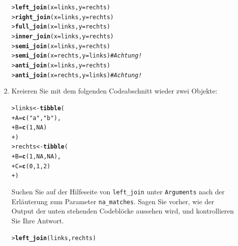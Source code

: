 \documentclass[oneside, 10pt]{book}\usepackage[]{graphicx}\usepackage[]{xcolor}
\makeatletter
\newcommand{\hlnum}[1]{\textcolor[rgb]{0.686,0.059,0.569}{#1}}%
\newcommand{\hlstr}[1]{\textcolor[rgb]{0.192,0.494,0.8}{#1}}%
\newcommand{\hlcom}[1]{\textcolor[rgb]{0.678,0.584,0.686}{\textit{#1}}}%
\newcommand{\hlstd}[1]{\textcolor[rgb]{0.345,0.345,0.345}{#1}}%
\newcommand{\hlkwb}[1]{\textcolor[rgb]{0.69,0.353,0.396}{#1}}%
\newcommand{\hlkwc}[1]{\textcolor[rgb]{0.333,0.667,0.333}{#1}}%
\newcommand{\hlkwd}[1]{\textcolor[rgb]{0.737,0.353,0.396}{\textbf{#1}}}%
\newenvironment{kframe}{%
 \def\at@end@of@kframe{}%
 \ifinner\ifhmode%
  \def\at@end@of@kframe{\end{minipage}}%
  \begin{minipage}{\columnwidth}%
 \fi\fi%
 \def\FrameCommand##1{\hskip\@totalleftmargin \hskip-\fboxsep
 \colorbox{shadecolor}{##1}\hskip-\fboxsep
     \hskip-\linewidth \hskip-\@totalleftmargin \hskip\columnwidth}%
 \MakeFramed {\advance\hsize-\width
   \@totalleftmargin\z@ \linewidth\hsize
   \@setminipage}}%
 {\par\unskip\endMakeFramed%
 \at@end@of@kframe}
\newenvironment{knitrout}{}{} %
\makeatother
\begin{document}
\begin{enumerate}
\begin{enumerate}
\begin{knitrout}
\color{fgcolor}\begin{kframe}
\begin{alltt}
\hlstd{> }\hlkwd{left_join}\hlstd{(}\hlkwc{x} \hlstd{= links,} \hlkwc{y} \hlstd{= rechts)}
\hlstd{> }\hlkwd{right_join}\hlstd{(}\hlkwc{x} \hlstd{= links,} \hlkwc{y} \hlstd{= rechts)}
\hlstd{> }\hlkwd{full_join}\hlstd{(}\hlkwc{x} \hlstd{= links,} \hlkwc{y} \hlstd{= rechts)}
\hlstd{> }\hlkwd{inner_join}\hlstd{(}\hlkwc{x} \hlstd{= links,} \hlkwc{y} \hlstd{= rechts)}
\hlstd{> }\hlkwd{semi_join}\hlstd{(}\hlkwc{x} \hlstd{= links,} \hlkwc{y} \hlstd{= rechts)}
\hlstd{> }\hlkwd{semi_join}\hlstd{(}\hlkwc{x} \hlstd{= rechts,} \hlkwc{y} \hlstd{= links)} \hlcom{# Achtung!}
\hlstd{> }\hlkwd{anti_join}\hlstd{(}\hlkwc{x} \hlstd{= links,} \hlkwc{y} \hlstd{= rechts)}
\hlstd{> }\hlkwd{anti_join}\hlstd{(}\hlkwc{x} \hlstd{= rechts,} \hlkwc{y} \hlstd{= links)} \hlcom{# Achtung!}
\end{alltt}
\end{kframe}
\end{knitrout}

  \item Kreieren Sie mit dem folgenden Codeabschnitt wieder zwei Objekte:
\begin{knitrout}
\color{fgcolor}\begin{kframe}
\begin{alltt}
\hlstd{> }\hlstd{links} \hlkwb{<-} \hlkwd{tibble}\hlstd{(}
\hlstd{+ }  \hlkwc{A} \hlstd{=} \hlkwd{c}\hlstd{(}\hlstr{"a"}\hlstd{,} \hlstr{"b"}\hlstd{),}
\hlstd{+ }  \hlkwc{B} \hlstd{=} \hlkwd{c}\hlstd{(}\hlnum{1}\hlstd{,} \hlnum{NA}\hlstd{)}
\hlstd{+ }\hlstd{)}
\hlstd{> }\hlstd{rechts} \hlkwb{<-} \hlkwd{tibble}\hlstd{(}
\hlstd{+ }  \hlkwc{B} \hlstd{=} \hlkwd{c}\hlstd{(}\hlnum{1}\hlstd{,} \hlnum{NA}\hlstd{,} \hlnum{NA}\hlstd{),}
\hlstd{+ }  \hlkwc{C} \hlstd{=} \hlkwd{c}\hlstd{(}\hlnum{0}\hlstd{,} \hlnum{1}\hlstd{,} \hlnum{2}\hlstd{)}
\hlstd{+ }\hlstd{)}
\end{alltt}
\end{kframe}
\end{knitrout}

Suchen Sie auf der Hilfeseite von \texttt{left\_join}
unter \texttt{Arguments} nach der Erläuterung zum Parameter
\texttt{na\_matches}. Sagen Sie vorher, wie der Output
der unten stehenden Codeblöcke aussehen wird,
und kontrollieren Sie Ihre Antwort.

\begin{knitrout}
\color{fgcolor}\begin{kframe}
\begin{alltt}
\hlstd{> }\hlkwd{left_join}\hlstd{(links, rechts)}
\end{alltt}
\end{kframe}
\end{knitrout}


\end{enumerate}
\end{enumerate}
\end{document}
